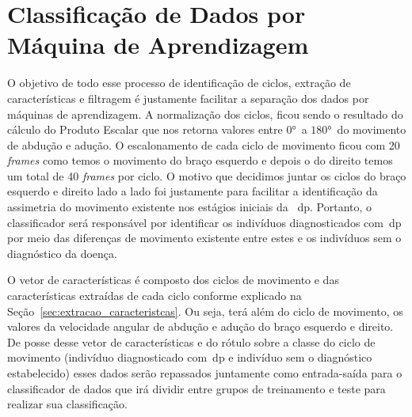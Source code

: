 

\section{Classificação de Dados por Máquina de Aprendizagem}\label{section:class_dados}
O objetivo de todo esse processo de identificação de ciclos, extração de características e filtragem é justamente facilitar a separação dos dados por máquinas de aprendizagem. A normalização dos ciclos, ficou sendo o resultado do cálculo do Produto Escalar que nos retorna valores entre $ 0° $\ a $ 180° $\ do movimento de abdução e adução. O escalonamento de cada ciclo de movimento ficou com 20 \textit{frames} como temos o movimento do braço esquerdo e depois o do direito temos um total de 40 \textit{frames} por ciclo. O motivo que decidimos juntar os ciclos do braço esquerdo e direito lado a lado foi justamente para facilitar a identificação da assimetria do movimento existente nos estágios iniciais da ~\ac{dp}. Portanto, o classificador será responsável por identificar os indivíduos diagnosticados com~\ac{dp} por meio das diferenças de movimento existente entre estes e os indivíduos sem o diagnóstico da doença. 




O vetor de características é composto dos ciclos de movimento e das características extraídas de cada ciclo conforme explicado na Seção~\ref{sec:extracao_caracteristcas}. Ou seja, terá além do ciclo de movimento, os valores da velocidade angular de abdução e adução do braço esquerdo e direito. De posse desse vetor de características e do rótulo sobre a classe do ciclo de movimento (indivíduo diagnosticado com~\ac{dp} e indivíduo sem o diagnóstico estabelecido) esses dados serão repassados juntamente como entrada-saída para o classificador de dados que irá dividir entre grupos de treinamento e teste para realizar sua classificação.

